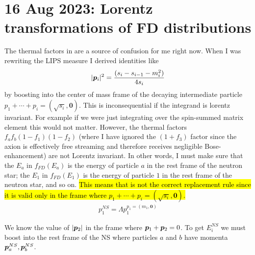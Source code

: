 \section{16 Aug 2023: Lorentz transformations of FD distributions}
\label{sec:lorentz-transformation-of-FD-distributions}

The thermal factors in  are a source of confusion for me right now. 
When I was rewriting the LIPS measure I derived identities like 
\begin{equation}
    \pmag[i]^2 = \frac{(s_i - s_{i-1} - m_i^2)}{4 s_i}
\end{equation}
by boosting into the center of mass frame of the decaying intermediate particle $p_1 + \cdots + p_{i} = (\sqrt{s_{i}}, \bm{0})$. 
This is inconsequential if the integrand is lorentz invariant. 
For example if we were just integrating over the spin-summed matrix element this would not matter. 
However, the thermal factors $f_a f_b (1-f_1)(1-f_2)$ (where I have ignored the $(1+f_3)$ factor since the axion is effectively free streaming and therefore receives negligible Bose-enhancement) are not Lorentz invariant.
In other words, I must make sure that the $E_a$ in $f_{FD}(E_a)$ is the energy of particle $a$ in the rest frame of the neutron star; the $E_1$ in $f_{FD}(E_1)$ is the energy of particle $1$ in the rest frame of the neutron star, and so on.
\hl{This means that {} is not the correct replacement rule since it is valid only in the frame where $p_1 + \cdots + p_i = (\sqrt{s_i}, \bm{0})$.}
\begin{align}
    p_1^{NS} = \Lambda p_1^{p_1 = (m_1, \bm{0})}
\end{align}

We know the value of $\pmag[2]$ in the frame where $\pvec[1] + \pvec[2] = 0$.
To get $E_i^{NS}$ we must boost into the rest frame of the NS where particles $a$ and $b$ have momenta $\pvec[a]^{NS}, \pvec[b]^{NS}$.